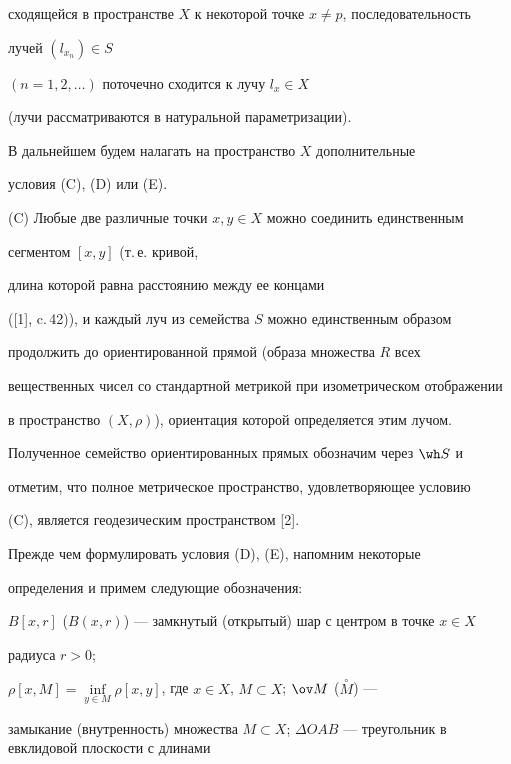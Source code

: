 сходящейся в пространстве $X$ к некоторой точке $x \ne p$, последовательность


лучей $(l_{x_{n}}) \in S$


$(n = 1, 2, \dotsc)$ поточечно сходится к лучу $l_{x} \in X$


(лучи рассматриваются в натуральной параметризации).





В дальнейшем будем налагать на пространство $X$ дополнительные


условия (C), (D) или (E).





(C) Любые две различные точки $x, y \in X$ можно соединить единственным


сегментом $[x, y]$ (т.\,е. кривой,


длина которой равна расстоянию между ее концами


([1], c.\,42)), и каждый луч из семейства $S$ можно единственным образом


продолжить до ориентированной прямой (образа множества $R$ всех


вещественных чисел со стандартной метрикой при изометрическом отображении


в пространство $(X,\rho)$), ориентация которой  определяется этим лучом.





Полученное семейство ориентированных прямых обозначим через $\wh S$ и


отметим, что полное метрическое пространство, удовлетворяющее условию


(C), является геодезическим пространством [2].





Прежде чем формулировать условия (D), (E), напомним некоторые


определения и примем следующие обозначения:


$B[x,r]$ ($B(x,r)$) --- замкнутый (открытый) шар с центром в точке $x \in X$


радиуса $r > 0$;


$\rho[x,M] = \inf\limits_{y \in M}{\rho[x,y]}$, где $x \in X$, $M\subset


X$; $\ov M$  ($\overset{\circ}{M}$) --- 


замыкание (внутренность) множества $M\subset


X$; $\Delta OAB$ --- треугольник в евклидовой плоскости с длинами


